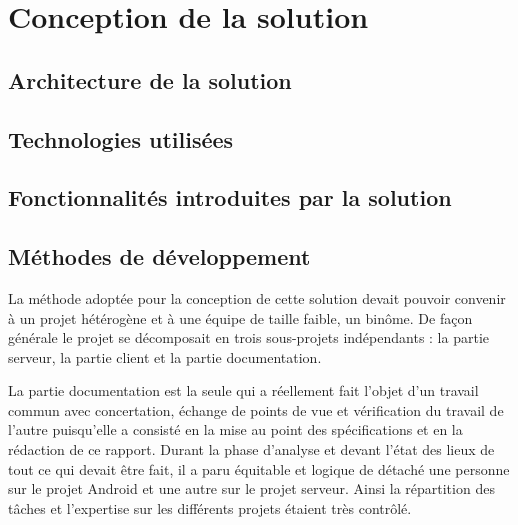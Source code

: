 \section{Conception de la solution}

\subsection{Architecture de la solution}

    

    

\subsection{Technologies utilisées}

    

    

\subsection{Fonctionnalités introduites par la solution}

    
    
    

\subsection{Méthodes de développement}

La méthode adoptée pour la conception de cette solution devait pouvoir convenir à un projet hétérogène et à une équipe de taille faible, un binôme. De façon générale le projet se décomposait en trois sous-projets indépendants : la partie serveur, la partie client et la partie documentation.

La partie documentation est la seule qui a réellement fait l’objet d’un travail commun avec concertation, échange de points de vue et vérification du travail de l’autre puisqu’elle a consisté en la mise au point des spécifications et en la rédaction de ce rapport. Durant la phase d’analyse et devant l’état des lieux de tout ce qui devait être fait, il a paru équitable et logique de détaché une personne sur le projet Android et une autre sur le projet serveur. Ainsi la répartition des tâches et l’expertise sur les différents projets étaient très contrôlé.

